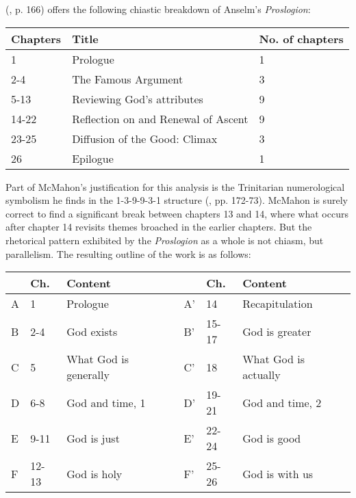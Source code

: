 \documentclass[]{birkjour}
\begin{document}
(\cite{McMahon2004}, p. 166) offers the following chiastic breakdown of Anselm's \textit{Proslogion}:
	
\begin{tabular}{l|l|l}
Chapters & Title & No. of chapters\\ \hline
1 & Prologue & 1\\ 
2-4 & The Famous Argument & 3\\ 
5-13 & Reviewing God's attributes & 9\\ 
14-22 & Reflection on and Renewal of Ascent & 9\\ 
23-25 & Diffusion of the Good: Climax & 3\\ 
26 & Epilogue & 1\\
\end{tabular}
	
Part of McMahon's justification for this analysis is the Trinitarian numerological symbolism he finds in the 1-3-9-9-3-1 structure (\cite{McMahon2004}, pp. 172-73).  McMahon is surely correct to find a significant break between chapters 13 and 14, where what occurs after chapter 14 revisits themes broached in the earlier chapters. But the rhetorical pattern exhibited by the \textit{Proslogion} as a whole is not chiasm, but parallelism. The resulting outline of the work is as follows:
	
\begin{tabular}{l|l|l|l|l|l}
& Ch. & Content & & Ch. & Content \\ \hline
A & 1 & Prologue & A' & 14 & Recapitulation \\
B & 2-4 & God exists & B' & 15-17 & God is greater \\
C & 5 & What God is generally & C' & 18 & What God is actually\\
D & 6-8 & God and time, 1 & D' & 19-21 & God and time, 2 \\
E & 9-11 & God is just & E' & 22-24 & God is good \\
F & 12-13 & God is holy & F' & 25-26 & God is with us \\
\end{tabular}
		
\end{document}
